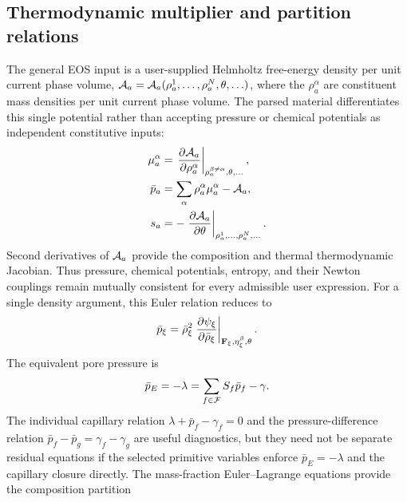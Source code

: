 \subsection{Thermodynamic multiplier and partition relations}
\label{sec:thermodynamic_partition_relations}

The general EOS input is a user-supplied Helmholtz free-energy density per unit
current phase volume,
\(\mathcal{A}_a=\mathcal{A}_a(\rho_a^1,\ldots,\rho_a^N,\theta,\ldots)\), where the
\(\rho_a^\alpha\) are constituent mass densities per unit current phase
volume.  The parsed material differentiates this single potential rather than
accepting pressure or chemical potentials as independent constitutive inputs:
\begin{subequations}
\begin{align}
 \mu_a^\alpha &=
 \left.\frac{\partial\mathcal{A}_a}{\partial\rho_a^\alpha}\right|_{\rho_a^{\beta\ne\alpha},\theta,\ldots},
 \label{eq:implementation_eos_chemical_potential}\\
 \bar p_a &= \sum_\alpha\rho_a^\alpha\mu_a^\alpha-\mathcal{A}_a,
 \label{eq:implementation_eos_pressure}\\
 s_a &= -\left.\frac{\partial\mathcal{A}_a}{\partial\theta}\right|_{\rho_a^1,\ldots,\rho_a^N,\ldots}.
 \label{eq:implementation_eos_entropy}
\end{align}
\end{subequations}
Second derivatives of \(\mathcal{A}_a\) provide the composition and thermal
thermodynamic Jacobian.  Thus pressure, chemical potentials, entropy, and their
Newton couplings remain mutually consistent for every admissible user
expression.  For a single density argument, this Euler relation reduces to
\begin{equation}
	\bar p_\xi
	=
	\bar\rho_\xi^2
	\left.\frac{\partial\psi_\xi}{\partial\bar\rho_\xi}\right|_{\mathbf{F}_\xi,\eta_\xi^\beta,\theta}.
	\label{eq:implementation_phase_pressure}
\end{equation}
The equivalent pore pressure is
\begin{equation}
	\bar p_E
	=
	-\lambda
	=
	\sum_{f\in\mathcal{F}}S_f\bar p_f-\gamma .
	\label{eq:implementation_equivalent_pressure_relation}
\end{equation}
The individual capillary relation
\(\lambda+\bar p_f-\gamma_f=0\) and the pressure-difference relation
\(\bar p_f-\bar p_g=\gamma_f-\gamma_g\) are useful diagnostics, but they need
not be separate residual equations if the selected primitive variables enforce
\(\bar p_E=-\lambda\) and the capillary closure directly.
The mass-fraction Euler--Lagrange equations provide the composition partition
